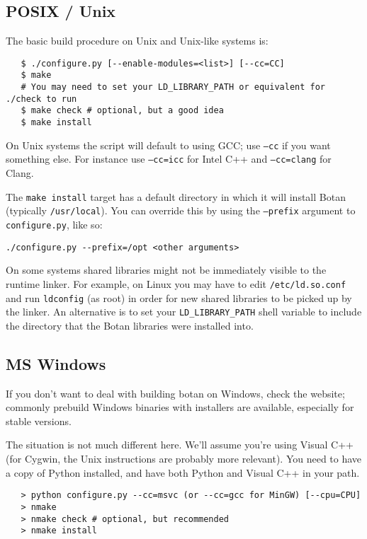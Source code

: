 \documentclass{article}
\newcommand{\filename}[1]{\texttt{#1}}
\begin{document}
\subsection{POSIX / Unix}

The basic build procedure on Unix and Unix-like systems is:

\begin{verbatim}
   $ ./configure.py [--enable-modules=<list>] [--cc=CC]
   $ make
   # You may need to set your LD_LIBRARY_PATH or equivalent for ./check to run
   $ make check # optional, but a good idea
   $ make install
\end{verbatim}

On Unix systems the script will default to using GCC; use
\texttt{--cc} if you want something else. For instance use
\texttt{--cc=icc} for Intel C++ and \texttt{--cc=clang} for Clang.

The \verb|make install| target has a default directory in which it
will install Botan (typically \verb|/usr/local|). You can override
this by using the \texttt{--prefix} argument to
\filename{configure.py}, like so:

\verb|./configure.py --prefix=/opt <other arguments>|

On some systems shared libraries might not be immediately visible to
the runtime linker. For example, on Linux you may have to edit
\filename{/etc/ld.so.conf} and run \texttt{ldconfig} (as root) in
order for new shared libraries to be picked up by the linker. An
alternative is to set your \texttt{LD\_LIBRARY\_PATH} shell variable
to include the directory that the Botan libraries were installed into.

\subsection{MS Windows}

If you don't want to deal with building botan on Windows, check the
website; commonly prebuild Windows binaries with installers are
available, especially for stable versions.

The situation is not much different here. We'll assume you're using
Visual C++ (for Cygwin, the Unix instructions are probably more
relevant). You need to have a copy of Python installed, and have both
Python and Visual C++ in your path.

\begin{verbatim}
   > python configure.py --cc=msvc (or --cc=gcc for MinGW) [--cpu=CPU]
   > nmake
   > nmake check # optional, but recommended
   > nmake install
\end{verbatim}
\end{document}
